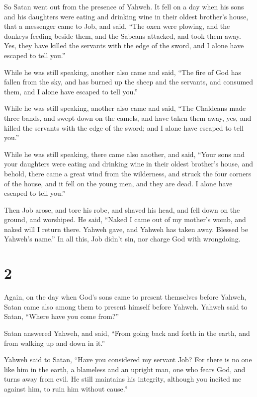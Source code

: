 So Satan went out from the presence of Yahweh.  It fell on
a day when his sons and his daughters were eating and drinking wine in
their oldest brother's house,  that a messenger came to
Job, and said, ``The oxen were plowing, and the donkeys feeding beside
them,  and the Sabeans attacked, and took them away. Yes,
they have killed the servants with the edge of the sword, and I alone
have escaped to tell you.''

 While he was still speaking, another also came and said,
``The fire of God has fallen from the sky, and has burned up the sheep
and the servants, and consumed them, and I alone have escaped to tell
you.''

 While he was still speaking, another also came and said,
``The Chaldeans made three bands, and swept down on the camels, and have
taken them away, yes, and killed the servants with the edge of the
sword; and I alone have escaped to tell you.''

 While he was still speaking, there came also another, and
said, ``Your sons and your daughters were eating and drinking wine in
their oldest brother's house,  and behold, there came a
great wind from the wilderness, and struck the four corners of the
house, and it fell on the young men, and they are dead. I alone have
escaped to tell you.''

 Then Job arose, and tore his robe, and shaved his head,
and fell down on the ground, and worshiped.  He said,
``Naked I came out of my mother's womb, and naked will I return there.
Yahweh gave, and Yahweh has taken away. Blessed be Yahweh's name.''
 In all this, Job didn't sin, nor charge God with
wrongdoing.

\hypertarget{section-1}{%
\section{2}\label{section-1}}

 Again, on the day when God's sons came to present
themselves before Yahweh, Satan came also among them to present himself
before Yahweh.  Yahweh said to Satan, ``Where have you come
from?''

Satan answered Yahweh, and said, ``From going back and forth in the
earth, and from walking up and down in it.''

 Yahweh said to Satan, ``Have you considered my servant Job?
For there is no one like him in the earth, a blameless and an upright
man, one who fears God, and turns away from evil. He still maintains his
integrity, although you incited me against him, to ruin him without
cause.''

